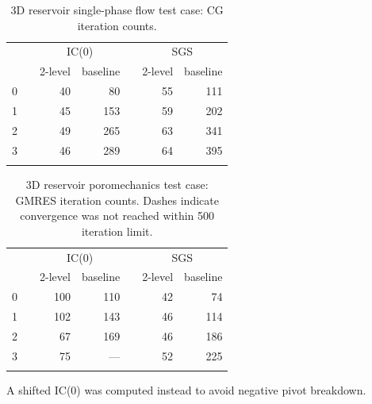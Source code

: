 \begin{table}
    \centering
    \caption{3D reservoir single-phase flow test case: CG iteration counts.}
    \label{tab:mazumodel2_matlab_conv_flow}
    \begin{tabular}{rrrrrrr}
        \hline\noalign{\smallskip}
        \multirow{2}{*}{$\ell$} & & \multicolumn{2}{c}{IC(0)} & & \multicolumn{2}{c}{SGS} \\
        \noalign{\smallskip}\cline{3-4} \cline{6-7}\noalign{\smallskip}
        & & 2-level & baseline & & 2-level & baseline \\
        \hline\noalign{\smallskip}
        0 & & 40 &  80 & & 55 & 111 \\
        1 & & 45 & 153 & & 59 & 202 \\
        2 & & 49 & 265 & & 63 & 341 \\
        3 & & 46 & 289 & & 64 & 395 \\
        \hline\noalign{\smallskip}
    \end{tabular}
\end{table}

\begin{table}
    \centering
    \caption{3D reservoir poromechanics test case: GMRES iteration counts.   Dashes indicate convergence was not reached within 500 iteration limit.}
    \label{tab:mazumodel2_matlab_conv_poro}
    \let\TPToverlap=\TPTrlap
    \begin{threeparttable}[t]
    \begin{tabular}{rrrrrrr}
        \hline\noalign{\smallskip}
        \multirow{2}{*}{$\ell$} & & \multicolumn{2}{c}{IC(0)} & & \multicolumn{2}{c}{SGS} \\
        \noalign{\smallskip}\cline{3-4} \cline{6-7}\noalign{\smallskip}
        & & 2-level & baseline & & 2-level & baseline \\
        \hline\noalign{\smallskip}
        0 & & 100 & 110 & & 42 &  74 \\
        1 & & 102 & 143 & & 46 & 114 \\
        2 & &  67 & 169 & & 46 & 186 \\
        3 & &  75\tnote{\textsuperscript{\textdagger}} & ---\tnote{\textsuperscript{\textdagger}} & & 52 & 225 \\
        \hline\noalign{\smallskip}
    \end{tabular}
    \begin{tablenotes}
        \item [\textsuperscript{\textdagger}] A shifted IC(0) was computed instead to avoid negative pivot breakdown.
    \end{tablenotes}
    \end{threeparttable}
\end{table}

